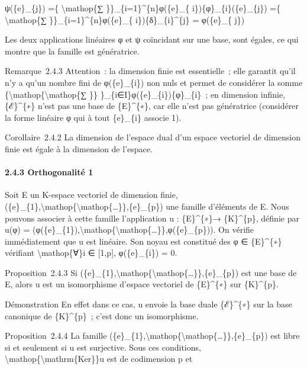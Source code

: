 \documentclass[]{article}
\begin{document}
ψ(\{e\}\_\{j\}) =\{ \textbackslash{}mathop\{∑
\}\}\_\{i=1\}\^{}\{n\}φ(\{e\}\_\{ i\})\{φ\}\_\{i\}(\{e\}\_\{j\}) =\{
\textbackslash{}mathop\{∑ \}\}\_\{i=1\}\^{}\{n\}φ(\{e\}\_\{
i\})\{δ\}\_\{i\}\^{}\{j\} = φ(\{e\}\_\{ j\})

Les deux applications linéaires φ et ψ coïncidant sur une base, sont
égales, ce qui montre que la famille est génératrice.

Remarque~2.4.3 Attention~: la dimension finie est essentielle~; elle
garantit qu'il n'y a qu'un nombre fini de φ(\{e\}\_\{i\}) non nuls et
permet de considérer la somme
\{\textbackslash{}mathop\{\textbackslash{}mathop\{∑ \}\}
\}\_\{i∈I\}φ(\{e\}\_\{i\})\{φ\}\_\{i\}~; en dimension infinie,
\{ℰ\}\^{}\{∗\} n'est pas une base de \{E\}\^{}\{∗\}, car elle n'est pas
génératrice (considérer la forme linéaire φ qui à tout \{e\}\_\{i\}
associe 1).

Corollaire~2.4.2 La dimension de l'espace dual d'un espace vectoriel de
dimension finie est égale à la dimension de l'espace.

\paragraph{2.4.3 Orthogonalité 1}

Soit E un K-espace vectoriel de dimension finie,
(\{e\}\_\{1\},\textbackslash{}mathop\{\textbackslash{}mathop\{\ldots{}\}\},\{e\}\_\{p\})
une famille d'éléments de E. Nous pouvons associer à cette famille
l'application u : \{E\}\^{}\{∗\}→ \{K\}\^{}\{p\}, définie par u(φ) =
(φ(\{e\}\_\{1\}),\textbackslash{}mathop\{\textbackslash{}mathop\{\ldots{}\}\},φ(\{e\}\_\{p\})).
On vérifie immédiatement que u est linéaire. Son noyau est constitué des
φ ∈ \{E\}\^{}\{∗\} vérifiant \textbackslash{}mathop\{∀\}i ∈ {[}1,p{]},
φ(\{e\}\_\{i\}) = 0.

Proposition~2.4.3 Si
(\{e\}\_\{1\},\textbackslash{}mathop\{\textbackslash{}mathop\{\ldots{}\}\},\{e\}\_\{p\})
est une base de E, alors u est un isomorphisme d'espace vectoriel de
\{E\}\^{}\{∗\} sur \{K\}\^{}\{p\}.

Démonstration En effet dans ce cas, u envoie la base duale
\{ℰ\}\^{}\{∗\} sur la base canonique de \{K\}\^{}\{p\}~; c'est donc un
isomorphisme.

Proposition~2.4.4 La famille
(\{e\}\_\{1\},\textbackslash{}mathop\{\textbackslash{}mathop\{\ldots{}\}\},\{e\}\_\{p\})
est libre si et seulement si u est surjective. Sous ces conditions,
\textbackslash{}mathop\{\textbackslash{}mathrm\{Ker\}\}u est de
codimension p et
\end{document}
